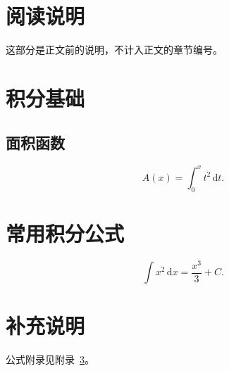 \documentclass[UTF8,11pt,openany,oneside,linespread=1]{ctexbook}
\begin{document}
\frontmatter
\chapter{阅读说明}
这部分是正文前的说明，不计入正文的章节编号。
\tableofcontents

\mainmatter
\chapter{积分基础}
\section{面积函数}
\[
  A(x)=\int_0^x t^2\,\mathrm{d}t.
\]

\appendix
\chapter{常用积分公式}\label{app:integrals}
\[
  \int x^2\,\mathrm{d}x=\frac{x^3}{3}+C.
\]

\backmatter
\chapter{补充说明}
公式附录见附录~\ref{app:integrals}。
\end{document}
